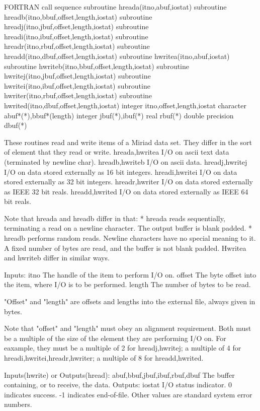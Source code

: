 \par{\tenpoint
{\eightpoint\begintt
FORTRAN call sequence
        subroutine hreada(itno,abuf,iostat)
        subroutine hreadb(itno,bbuf,offset,length,iostat)
        subroutine hreadj(itno,jbuf,offset,length,iostat)
        subroutine hreadi(itno,ibuf,offset,length,iostat)
        subroutine hreadr(itno,rbuf,offset,length,iostat)
        subroutine hreadd(itno,dbuf,offset,length,iostat)
        subroutine hwritea(itno,abuf,iostat)
        subroutine hwriteb(itno,bbuf,offset,length,iostat)
        subroutine hwritej(itno,jbuf,offset,length,iostat)
        subroutine hwritei(itno,ibuf,offset,length,iostat)
        subroutine hwriter(itno,rbuf,offset,length,iostat)
        subroutine hwrited(itno,dbuf,offset,length,iostat)
        integer itno,offset,length,iostat
        character abuf*(*),bbuf*(length)
        integer jbuf(*),ibuf(*)
        real rbuf(*)
        double precision dbuf(*)

  These routines read and write items of a Miriad data set. They
  differ in the sort of element that they read or write.
        hreada,hwritea  I/O on ascii text data (terminated by newline char).
        hreadb,hwriteb  I/O on ascii data.
        hreadj,hwritej  I/O on data stored externally as 16 bit integers.
        hreadi,hwritei  I/O on data stored externally as 32 bit integers.
        hreadr,hwriter  I/O on data stored externally as IEEE 32 bit reals.
        hreadd,hwrited  I/O on data stored externally as IEEE 64 bit reals.

  Note that hreada and hreadb differ in that:
    * hreada reads sequentially, terminating a read on a newline character.
      The output buffer is blank padded.
    * hreadb performs random reads. Newline characters have no special
      meaning to it. A fixed number of bytes are read, and the buffer is
      not blank padded.
   Hwritea and hwriteb differ in similar ways.

  Inputs:
    itno        The handle of the item to perform I/O on.
    offset      The byte offset into the item, where I/O is to be
                performed.
    length      The number of bytes to be read.

  "Offset" and "length" are offsets and lengths into the external file, always
  given in bytes.

  Note that "offset" and "length" must obey an alignment requirement. Both
  must be a multiple of the size of the element they are performing I/O on.
  For eaxample, they must be a multiple of 2 for hreadj,hwritej; a multiple
  of 4 for hreadi,hwritei,hreadr,hwriter; a multiple of 8 for hreadd,hwrited.

  Inputs(hwrite) or Outputs(hread):
    abuf,bbuf,jbuf,ibuf,rbuf,dbuf The buffer containing, or to receive,
                the data.
  Outputs:
    iostat      I/O status indicator. 0 indicates success. -1 indicates
                end-of-file. Other values are standard system
                error numbers.                                          
\endtt}
\par}

